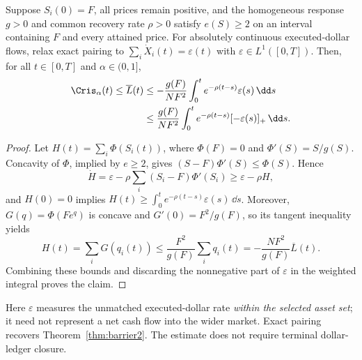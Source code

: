 \documentclass[review,hidelinks,onefignum,onetabnum]{siamonline250211}
\begin{document}
\begin{proposition}
\label{prop:unbalanced-stability}
Suppose $S_i(0)=F$, all prices remain positive, and the homogeneous
response $g>0$ and common recovery rate $\rho>0$ satisfy
$e(S)\ge2$ on an interval containing $F$ and every attained price.
For absolutely continuous executed-dollar flows, relax exact pairing
to $\sum_i\dot X_i(t)=\varepsilon(t)$ with
$\varepsilon\in L^1([0,T])$. Then, for all $t\in[0,T]$ and
$\alpha\in(0,1]$,
\[
\begin{aligned}
\Cris_\alpha(t)\le\overline L(t)
&\le-\frac{g(F)}{NF^2}
 \int_0^t e^{-\rho(t-s)}\varepsilon(s)\,\dd s\\
&\le\frac{g(F)}{NF^2}
 \int_0^t e^{-\rho(t-s)}[-\varepsilon(s)]_+\,\dd s.
\end{aligned}
\]
\end{proposition}
\begin{proof}
Let $H(t)=\sum_i\Phi(S_i(t))$, where $\Phi(F)=0$
and $\Phi'(S)=S/g(S)$. Concavity of $\Phi$, implied by
$e\ge2$, gives $(S-F)\Phi'(S)\le\Phi(S)$. Hence
\[
\dot H=\varepsilon-\rho\sum_i(S_i-F)\Phi'(S_i)
\ge\varepsilon-\rho H,
\]
and $H(0)=0$ implies
$H(t)\ge\int_0^t e^{-\rho(t-s)}\varepsilon(s)\,\dd s$.
Moreover, $G(q)=\Phi(Fe^q)$ is concave and
$G'(0)=F^2/g(F)$, so its tangent inequality yields
\[
H(t)=\sum_iG(q_i(t))
\le\frac{F^2}{g(F)}\sum_iq_i(t)
=-\frac{NF^2}{g(F)}\overline L(t).
\]
Combining these bounds and discarding the nonnegative part of
$\varepsilon$ in the weighted integral proves the claim.
\end{proof}

Here $\varepsilon$ measures the unmatched executed-dollar rate
\emph{within the selected asset set}; it need not represent a net
cash flow into the wider market. Exact pairing recovers
Theorem~\ref{thm:barrier2}. The estimate does not require
terminal dollar-ledger closure.
\end{document}
